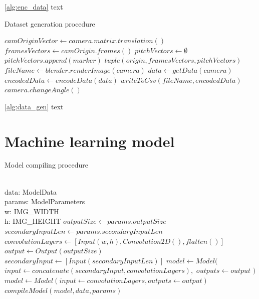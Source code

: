 \documentclass[
    11pt,
    oneside
]{report}
\begin{document}
\ref{alg:enc_data} text


\begin{algorithm}[H]
\begin{algorithmic}
\caption{Dataset generation procedure}\label{alg:data_gen}
    \State $camOriginVector \gets camera.matrix.translation()$
    \State $framesVectors \gets camOrigin.frames()$
    \State $pitchVectors \gets \emptyset$
        \State $pitchVectors.append(marker)$
    \EndFor
    \State
    \Return $tuple(origin, framesVectors, pitchVectors)$
\EndProcedure
{}
    \State $fileName \gets blender.renderImage(camera)$
    \State $data \gets getData(camera)$
    \State $encodedData \gets encodeData(data)$
    \State $writeToCsv(fileName, encodedData)$
    \State $camera.changeAngle()$
\EndFor
\end{algorithmic}
\end{algorithm}


\ref{alg:data_gen} text




\section{Machine learning model}



\begin{algorithm}[H]
\begin{algorithmic}
\caption{Model compiling procedure}\label{alg:model_comp}
\Require \\
    data: ModelData \\
    params: ModelParameters \\
    w: IMG\_WIDTH \\
    h: IMG\_HEIGHT
\State
\State $outputSize \gets params.outputSize$
\State $secondaryInputLen \gets params.secondaryInputLen$
\State $convolutionLayers \gets [Input(w, h), Convolution2D(), flatten()]$
\State $output \gets Output(outputSize)$
    \State $secondaryInput \gets [Input(secondaryInputLen)]$
    \State $model \gets Model($
        \State \indent $input \gets concatenate(secondaryInput, convolutionLayers),$
            \State \indent $outputs \gets output$
    \State $)$
\Else
    \State $model \gets Model(input \gets convolutionLayers, outputs \gets output)$
\EndIf
\State $compileModel(model, data, params)$
\end{algorithmic}
\end{algorithm}
\end{document}
